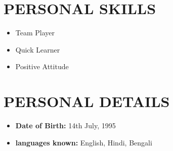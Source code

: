 \documentclass[letterpaper,11pt]{article}
\newcommand{\resumeSubHeadingListStart}{\begin{itemize}[leftmargin=0.0in, label={}]}
\newcommand{\resumeSubHeadingListEnd}{\end{itemize}}
\begin{document}
\vspace{-30pt}
\section{PERSONAL SKILLS}
        \begin{multicols}{4}
            \begin{itemize}[itemsep=-2pt, parsep=5pt]
                \item Team Player
                \item Quick Learner
                \item Positive Attitude
            \end{itemize}
        \end{multicols}
        \vspace*{2.0\multicolsep}

\vspace{-10pt}
\section{PERSONAL DETAILS}
\begin{itemize} 
\item \textbf{Date of Birth:} 14th July, 1995
\vspace{-10pt}
\item \textbf{languages known: } English, Hindi, Bengali
\end{itemize} 
\end{document}
